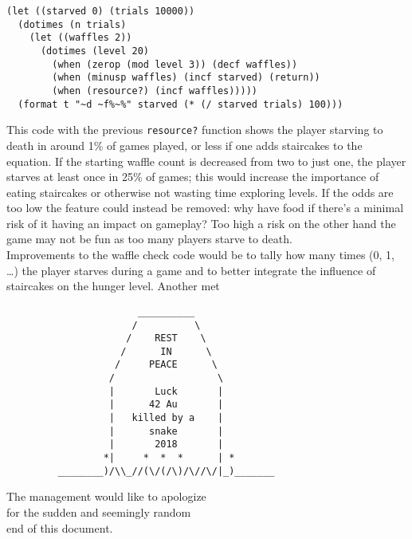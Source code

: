 \documentclass[12pt,a4paper]{article}
\begin{document}
\begin{verbatim}
(let ((starved 0) (trials 10000))
  (dotimes (n trials)
    (let ((waffles 2))
      (dotimes (level 20)
        (when (zerop (mod level 3)) (decf waffles))
        (when (minusp waffles) (incf starved) (return))
        (when (resource?) (incf waffles)))))
  (format t "~d ~f%~%" starved (* (/ starved trials) 100)))
\end{verbatim}

This code with the previous \texttt{resource?} function shows the player
starving to death in around 1\% of games played, or less if one adds
staircakes to the equation. If the starting waffle count is decreased
from two to just one, the player starves at least once in 25\% of games;
this would increase the importance of eating staircakes or otherwise not
wasting time exploring levels. If the odds are too low the feature could
instead be removed: why have food if there's a minimal risk of it having
an impact on gameplay? Too high a risk on the other hand the game may
not be fun as too many players starve to death. \\

Improvements to the waffle check code would be to tally how many times
(0, 1, \ldots) the player starves during a game and to better integrate
the influence of staircakes on the hunger level. Another met
\vspace{-2.2em}
\begin{verbatim}
                       __________
                      /          \
                     /    REST    \
                    /      IN      \
                   /     PEACE      \
                  /                  \
                  |       Luck       |
                  |      42 Au       |
                  |   killed by a    |
                  |      snake       |
                  |       2018       |
                 *|     *  *  *      | *
         ________)/\\_//(\/(/\)/\//\/|_)_______
\end{verbatim}
\clearpage
\center
The management would like to apologize\\
for the sudden and seemingly random\\
end of this document.
\end{document}

